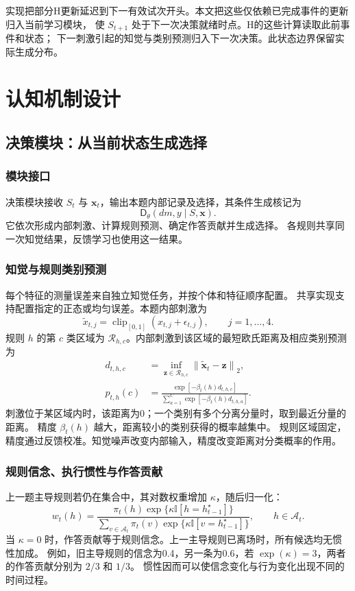 \documentclass[11pt,a4paper]{article}
\numberwithin{equation}{section}
\newcommand{\ind}{\mathbb{I}}
\newcommand{\norm}[1]{\left\lVert#1\right\rVert}
\newcommand{\clip}{\operatorname{clip}}
\newcommand{\A}{\mathcal{A}}
\newcommand{\Dd}{\mathsf{D}}
\begin{document}
实现把部分H更新延迟到下一有效试次开头。本文把这些仅依赖已完成事件的更新归入当前学习模块，
使 $S_{t+1}$ 处于下一次决策就绪时点。H的这些计算读取此前事件和状态；
下一刺激引起的知觉与类别预测归入下一次决策。此状态边界保留实际生成分布。

\section{认知机制设计}
\label{sec:mechanisms}

\subsection{决策模块：从当前状态生成选择}
\label{sec:decision}

\subsubsection{模块接口}
决策模块接收 $S_t$ 与 $\bm x_t$，输出本题内部记录及选择，其条件生成核记为
\begin{equation}
\Dd_\theta(dm,y\mid S,\bm x).
\end{equation}
它依次形成内部刺激、计算规则预测、确定作答贡献并生成选择。
各规则共享同一次知觉结果，反馈学习也使用这一结果。

\subsubsection{知觉与规则类别预测}
每个特征的测量误差来自独立知觉任务，并按个体和特征顺序配置。
共享实现支持配置指定的正态或均匀误差。本题内部刺激为
\begin{equation}
\widetilde x_{t,j}=\clip_{[0,1]}(x_{t,j}+\epsilon_{t,j}),\qquad j=1,\ldots,4.
\label{eq:perception}
\end{equation}
规则 $h$ 的第 $c$ 类区域为 $\mathcal R_{h,c}$。内部刺激到该区域的最短欧氏距离及相应类别预测为
\begin{align}
d_{t,h,c}&=\inf_{\bm z\in\mathcal R_{h,c}}\norm{\widetilde{\bm x}_t-\bm z}_2,\\
p_{t,h}(c)&=\frac{\exp[-\beta_t(h)d_{t,h,c}]}
{\sum_{a=1}^{C}\exp[-\beta_t(h)d_{t,h,a}]}.
\label{eq:category-probability}
\end{align}
刺激位于某区域内时，该距离为0；一个类别有多个分离分量时，取到最近分量的距离。
精度 $\beta_t(h)$ 越大，距离较小的类别获得的概率越集中。
规则区域固定，精度通过反馈校准。知觉噪声改变内部输入，精度改变距离对分类概率的作用。

\subsubsection{规则信念、执行惯性与作答贡献}
上一题主导规则若仍在集合中，其对数权重增加 $\kappa$，随后归一化：
\begin{equation}
w_t(h)=\frac{\pi_t(h)\exp\{\kappa\ind[h=h_{t-1}^{\star}]\}}
{\sum_{v\in\A_t}\pi_t(v)\exp\{\kappa\ind[v=h_{t-1}^{\star}]\}},\qquad h\in\A_t.
\label{eq:choice-weight}
\end{equation}
当 $\kappa=0$ 时，作答贡献等于规则信念。上一主导规则已离场时，所有候选均无惯性加成。
例如，旧主导规则的信念为0.4，另一条为0.6，若 $\exp(\kappa)=3$，两者的作答贡献分别为 $2/3$ 和 $1/3$。
惯性因而可以使信念变化与行为变化出现不同的时间过程。
\end{document}

